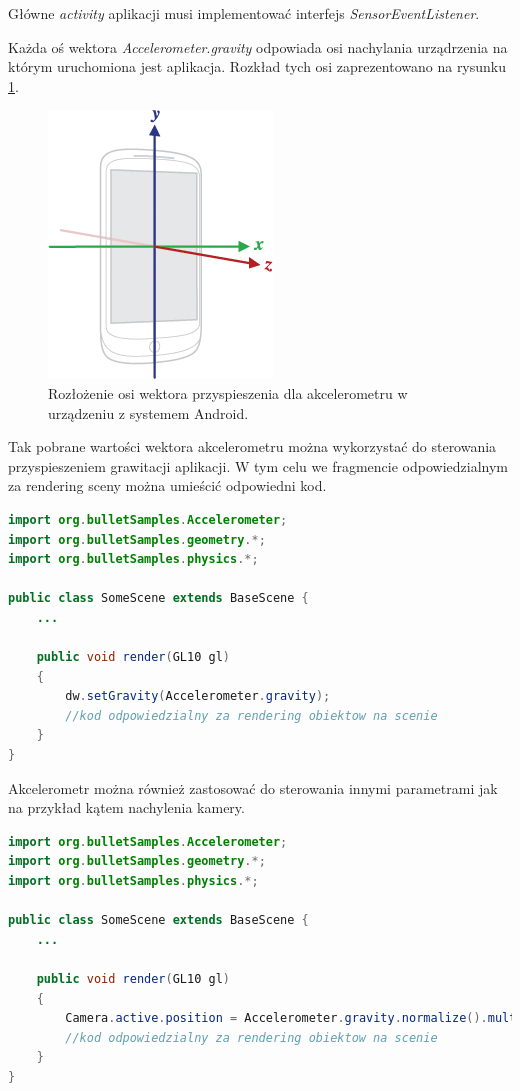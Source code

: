Główne \emph{activity} aplikacji musi implementować interfejs
\emph{SensorEventListener}. 

Każda oś wektora \emph{Accelerometer}.\emph{gravity} odpowiada osi nachylania
urządrzenia na którym uruchomiona jest aplikacja. Rozkład tych osi
zaprezentowano na rysunku \ref{fig:axis_device}.

\begin{figure}
\centering
\includegraphics[scale = 0.6]{./img/axis_device.png}
\caption{Rozłożenie osi wektora przyspieszenia dla akcelerometru w urządzeniu
z systemem Android.}
\label{fig:axis_device}
\end{figure}

Tak pobrane wartości wektora akcelerometru można wykorzystać do sterowania
przyspieszeniem grawitacji aplikacji. W tym celu we fragmencie odpowiedzialnym
za rendering sceny można umieścić odpowiedni kod.

\begin{lstlisting}[language=java, caption=Sterowanie wektorem przyspieszenia
ziemskiego przy pomocy akcelerometru]import org.bulletSamples.Accelerometer;
import org.bulletSamples.geometry.*;
import org.bulletSamples.physics.*;

public class SomeScene extends BaseScene {
	...
	
	public void render(GL10 gl)
	{
		dw.setGravity(Accelerometer.gravity);
		//kod odpowiedzialny za rendering obiektow na scenie
	}
}
\end{lstlisting}

Akcelerometr można również zastosować do sterowania innymi parametrami jak na
przykład kątem nachylenia kamery.

\begin{lstlisting}[language=java, caption=Sterowanie kątem nachylenia kamery
przy pomocy akcelerometru, label=lis:accCamera]import org.bulletSamples.Accelerometer;
import org.bulletSamples.geometry.*;
import org.bulletSamples.physics.*;

public class SomeScene extends BaseScene {
	...
	
	public void render(GL10 gl)
	{
		Camera.active.position = Accelerometer.gravity.normalize().multiply(60);
		//kod odpowiedzialny za rendering obiektow na scenie
	}
}
\end{lstlisting}

